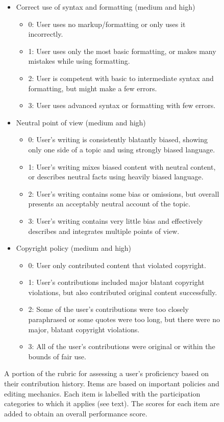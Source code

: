 \documentclass{acm_proc_article-sp}
\begin{document}
\begin{figure}
\centering

\begin{itemize}
\item Correct use of syntax and formatting (medium and high)
    \begin{itemize}
    \item 0: User uses no markup/formatting or only uses it incorrectly.
    \item 1: User uses only the most basic formatting, or makes many mistakes while using formatting.
    \item 2: User is competent with basic to intermediate syntax and formatting, but might make a few errors.
    \item 3: User uses advanced syntax or formatting with few errors.
    \end{itemize}
\item Neutral point of view (medium and high)
    \begin{itemize}
    \item 0: User's writing is consistently blatantly biased, showing only one side of a topic and using strongly biased language.
    \item 1: User's writing mixes biased content with neutral content, or describes neutral facts using heavily biased language.
    \item 2: User's writing contains some bias or omissions, but overall presents an acceptably neutral account of the topic.
    \item 3: User's writing contains very little bias and effectively describes and integrates multiple points of view.
    \end{itemize}
\item Copyright policy (medium and high)
    \begin{itemize}
    \item 0: User only contributed content that violated copyright.
    \item 1: User's contributions included major blatant copyright violations, but also contributed original content successfully.
    \item 2: Some of the user's contributions were too closely paraphrased or some quotes were too long, but there were no major, blatant copyright violations.
    \item 3: All of the user's contributions were original or within the bounds of fair use.
    \end{itemize}
\end{itemize}

\caption{A portion of the rubric for assessing a user's proficiency based on their contribution history. Items are based on important policies and editing mechanics. Each item is labelled with the participation categories to which it applies (see text). The scores for each item are added to obtain an overall performance score.}
\label{fig:rubric}
\end{figure}
\end{document}
